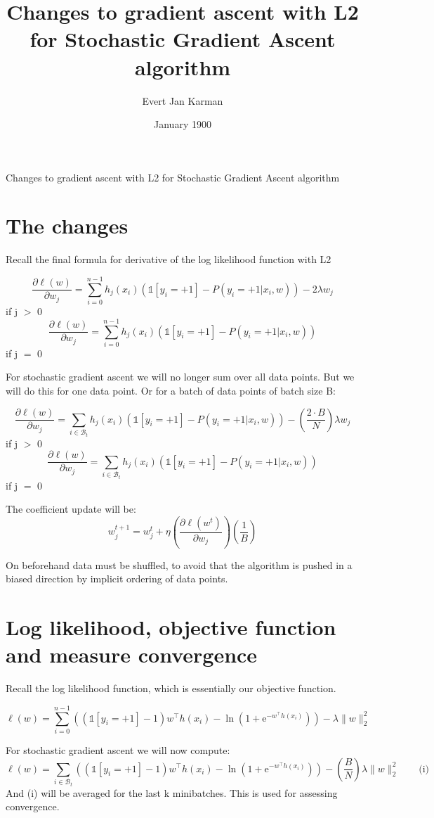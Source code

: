 \documentclass[12pt, letterpaper]{article}
\title{Changes to gradient ascent with L2 for Stochastic Gradient Ascent algorithm}
\author{Evert Jan Karman}
\date{January 1900}
\begin{document}
\maketitle

Changes to gradient ascent with L2 for Stochastic Gradient Ascent algorithm

\section{The changes}

Recall the final formula for derivative of the log likelihood function with L2

\[
\frac{\partial \ell(w)}{\partial w_j} = \sum_{i=0}^{n-1} h_j(x_i) ( \mathds{1}[y_i=+1] - P(y_i=+1 | x_i,w)) - 2 \lambda w_{j}
\]
if j \(>\) 0
\[
\frac{\partial \ell(w)}{\partial w_j} = \sum_{i=0}^{n-1} h_j(x_i) ( \mathds{1}[y_i=+1] - P(y_i=+1 | x_i,w))
\]
if j \(=\) 0

\medskip
For stochastic gradient ascent we will no longer sum over all data points.
\medskip
But we will do this for one data point. Or for a batch of data points of batch size B:

\[
\frac{\partial \ell(w)}{\partial w_j} = \sum_{i\in\mathcal B_t} h_j(x_i) ( \mathds{1}[y_i=+1] - P(y_i=+1 | x_i,w)) - ( \frac{2 \cdot B}{N} ) \lambda w_{j}
\]
if j \(>\) 0
\[
\frac{\partial \ell(w)}{\partial w_j} = \sum_{i\in\mathcal B_t} h_j(x_i) ( \mathds{1}[y_i=+1] - P(y_i=+1 | x_i,w))
\]
if j \(=\) 0

\medskip

The coefficient update will be:
\[
w_j^{t+1}
=
w_j^t
+
\eta
\left(
\frac{\partial \ell(w^t)}{\partial w_j}
\right)
\left(
\frac{1}{B}
\right)
\]

\medskip

On beforehand data must be shuffled, to avoid that the algorithm is pushed in a biased direction by implicit ordering of data points.

\section{Log likelihood, objective function and measure convergence}

Recall the log likelihood function, which is essentially our objective function.

\[
\ell(w)
= \sum_{i=0}^{n-1} ( ( \mathds{1}[y_i=+1] - 1) w^\top h(x_i) - \ln ( 1 + \mathrm{e}^{-w^\top h(x_i)} ) ) - \lambda \lVert w \rVert_2^2
\]

For stochastic gradient ascent we will now compute:
\[
\ell(w)
= \sum_{i\in\mathcal B_t} ( ( \mathds{1}[y_i=+1] - 1) w^\top h(x_i) - \ln ( 1 + \mathrm{e}^{-w^\top h(x_i)} ) ) - ( \frac{B}{N} ) \lambda \lVert w \rVert_2^2
\qquad \text{(i)}
\]
And (i) will be averaged for the last k minibatches.
\medskip
This is used for assessing convergence.
\end{document}
